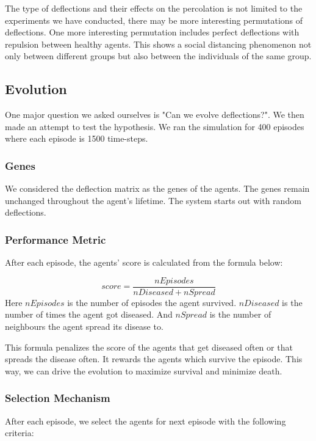 \documentclass[a4paper,11pt]{article}
\begin{document}
    The type of deflections and their effects on the percolation is not limited to the experiments we have conducted, there may be more interesting permutations of deflections.
    One more interesting permutation includes perfect deflections with repulsion between healthy agents.
    This shows a social distancing phenomenon not only between different groups but also between the individuals of the same group.

    \subsection{Evolution}\label{subsec:evolution}
    One major question we asked ourselves is "Can we evolve deflections?".
    We then made an attempt to test the hypothesis.
    We ran the simulation for 400 episodes where each episode is 1500 time-steps.

    \subsubsection{Genes}
    We considered the deflection matrix as the genes of the agents.
    The genes remain unchanged throughout the agent's lifetime.
    The system starts out with random deflections.

    \subsubsection{Performance Metric}
    After each episode, the agents' score is calculated from the formula below:

    \begin{equation}
        score = \frac{nEpisodes}{nDiseased + nSpread}
    \end{equation}
    Here $nEpisodes$ is the number of episodes the agent survived.
    $nDiseased$ is the number of times the agent got diseased.
    And $nSpread$ is the number of neighbours the agent spread its disease to.

    This formula penalizes the score of the agents that get diseased often or that spreads the disease often.
    It rewards the agents which survive the episode.
    This way, we can drive the evolution to maximize survival and minimize death.

    \subsubsection{Selection Mechanism}
    After each episode, we select the agents for next episode with the following criteria:
\end{document}
